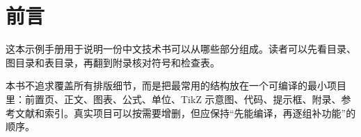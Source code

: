 \chapter*{前言}
\thispagestyle{plain}

这本示例手册用于说明一份中文技术书可以从哪些部分组成。读者可以先看目录、图目录和表目录，再翻到附录核对符号和检查表。

本书不追求覆盖所有排版细节，而是把最常用的结构放在一个可编译的最小项目里：前置页、正文、图表、公式、单位、TikZ 示意图、代码、提示框、附录、参考文献和索引。真实项目可以按需要增删，但应保持“先能编译，再逐组补功能”的顺序。

